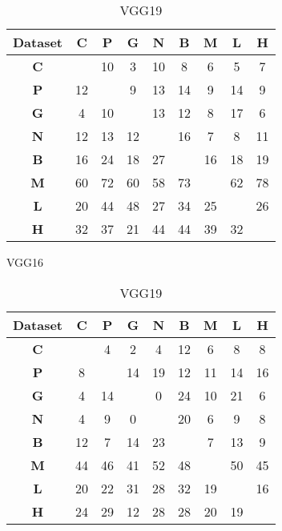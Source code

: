 \begin{table}
  \centering
  \begin{subtable}[h]{0.45\textwidth}
    \centering
    \begin{tabular}{|c|cccccccc|} 
    \hline
    Dataset & \textbf{C} & \textbf{P} & \textbf{G} & \textbf{N} & \textbf{B} & \textbf{M} & \textbf{L} & \textbf{H}\\
    \hline
    \textbf{C} &   & 10 & 3 & 10 & 8 & 6 & 5 & 7 \\
    \textbf{P} & 12 &   & 9 & 13 & 14 & 9 & 14 & 9 \\
    \textbf{G} & 4 & 10 &   & 13 & 12 & 8 & 17 & 6 \\
    \textbf{N} & 12 & 13 & 12 &   & 16 & 7 & 8 & 11 \\
    \textbf{B} & 16 & 24 & 18 & 27 &   & 16 & 18 & 19 \\
    \textbf{M} & 60 & 72 & 60 & 58 & 73 &   & 62 & 78 \\
    \textbf{L} & 20 & 44 & 48 & 27 & 34 & 25 &   & 26 \\
    \textbf{H} & 32 & 37 & 21 & 44 & 44 & 39 & 32 & \\
    \hline
    \end{tabular}
    \caption{VGG16}
  \end{subtable}

  \begin{subtable}[h]{0.45\textwidth}
    \centering
    \begin{tabular}{|c|cccccccc|} 
    \hline
    Dataset & \textbf{C} & \textbf{P} & \textbf{G} & \textbf{N} & \textbf{B} & \textbf{M} & \textbf{L} & \textbf{H}\\
    \hline
    \textbf{C} &   & 4 & 2 & 4 & 12 & 6 & 8 & 8 \\
    \textbf{P} & 8 &   & 14 & 19 & 12 & 11 & 14 & 16 \\
    \textbf{G} & 4 & 14 &   & 0 & 24 & 10 & 21 & 6 \\
    \textbf{N} & 4 & 9 & 0 &   & 20 & 6 & 9 & 8 \\
    \textbf{B} & 12 & 7 & 14 & 23 &   & 7 & 13 & 9 \\
    \textbf{M} & 44 & 46 & 41 & 52 & 48 &   & 50 & 45 \\
    \textbf{L} & 20 & 22 & 31 & 28 & 32 & 19 &   & 16 \\
    \textbf{H} & 24 & 29 & 12 & 28 & 28 & 20 & 19 & \\
    \hline
    \end{tabular}
    \caption{VGG19}
  \end{subtable} \\


\end{table}
